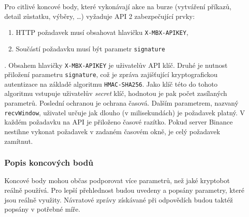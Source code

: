 Pro citlivé koncové body, které vykonávají akce na burze (vytváření příkazů, detail zůstatku, výběry, \ldots) vyžaduje API 2 zabezpečující prvky:
\begin{enumerate}
    \item HTTP požadavek musí obsahovat hlavičku \verb|X-MBX-APIKEY|,
    \item Součástí požadavku musí být parametr \verb|signature|
\end{enumerate} .
Obsahem hlavičky \verb|X-MBX-APIKEY| je uživatelův API klíč. Druhé je nutnost přiložení parametru \verb|signature|, což je zpráva zajišťující kryptografickou autentizace na základě
algoritmu \verb|HMAC-SHA256|. Jako klíč této do tohoto algoritmu vstupuje uživatelův \emph{secret} klíč, hodnotou je pak počet zasílaných parametrů.
Poslední ochranou je ochrana časová. Dalším parametrem, nazvaný \verb|recvWindow|, uživatel určuje jak dlouho (v milisekundách) je požadavek platný. V každém požadavku na API je přiloženo
časové razítko. Pokud server Binance nestihne vykonat požadavek v zadaném časovém okně, je celý požadavek zamítnut.

\subsubsection{Popis koncových bodů}
Koncové body mohou občas podporovat více parametrů, než jaké kryptobot reálně používá. Pro lepší přehlednost budou uvedeny a popsány parametry, které jsou reálně využity. Návratové zprávy získávané
při odpovědích budou taktéž popsány v potřebné míře.

